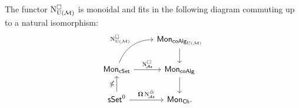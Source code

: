 \begin{lemma}\label{l:lift of cobar to e-infty}
	The functor $\operatorname{N^{\square}_{{\operatorname{U}(\mathcal{M})}}}$ is monoidal and fits in the following diagram commuting up to a natural isomorphism:
	\[
	\begin{tikzcd}
		& \Mon_{\coAlg_\UM} \arrow[d] \\
		\Mon_{\cSet} \arrow[ru, "\cchainsUM", out=70, in=180] \arrow[r, "\cchainsA"]
		& \Mon_{\coAlg} \arrow[d] \\
		\sSet^0 \arrow[r, "\cobar \schainsA"] \arrow[u, "\ccobar"]
		& \Mon_{\Ch}.
	\end{tikzcd}
	\]
\end{lemma}

%
%
%

